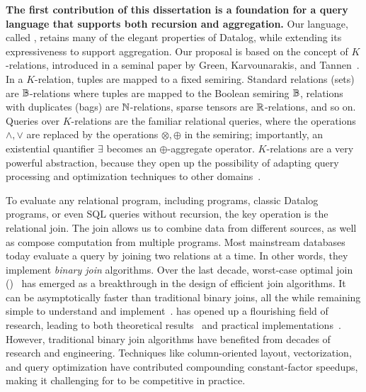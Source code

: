 \textbf{
The first contribution of this dissertation is a foundation for a query language that
supports both recursion and aggregation.}  
Our language, called \datalogo, 
 retains many of the elegant properties of Datalog,
 while extending its expressiveness to support aggregation.
Our proposal is based on the
concept of $K$-relations, introduced in a seminal
paper by Green, Karvounarakis, and Tannen~\cite{DBLP:conf/pods/GreenKT07}.
In a $K$-relation, tuples are
mapped to a fixed semiring. Standard relations (sets) are
$\mathbb B$-relations where tuples are mapped to the Boolean semiring $\mathbb B$,
relations with duplicates (bags) are $\mathbb N$-relations, sparse tensors
are $\mathbb R$-relations, and so on.  Queries over $K$-relations are the
familiar relational queries, where the operations $\wedge, \vee$ are
replaced by the operations $\otimes, \oplus$ in the semiring;
importantly, an existential quantifier $\exists$ becomes an
$\oplus$-aggregate operator.
$K$-relations are a very powerful abstraction, because they open up
the possibility of adapting query processing and optimization
techniques to other domains~\cite{DBLP:conf/pods/KhamisNR16}.

To evaluate any relational program, 
 including \datalogo programs,
 classic Datalog programs, 
 or even SQL queries without recursion, 
 the key operation is the relational join.
The join allows us to combine data from different sources, 
 as well as compose computation from multiple programs.
Most mainstream databases today evaluate a query 
 by joining two relations at a time.
In other words, they implement {\em binary join} algorithms.
Over the last decade, worst-case optimal join (\WCOJ)~\cite{
  DBLP:conf/pods/NgoPRR12,
  DBLP:conf/icdt/Veldhuizen14, 
  DBLP:journals/sigmod/NgoRR13, 
  DBLP:conf/pods/000118}
 has emerged as
 a breakthrough in the design of efficient join algorithms.  
It can be
asymptotically faster than traditional binary joins, all the while
remaining simple to understand and
implement~\cite{DBLP:journals/sigmod/NgoRR13}.  
\WCOJ has opened up a flourishing field of research, leading to both theoretical
results~\cite{DBLP:journals/sigmod/NgoRR13,DBLP:conf/pods/Khamis0S17}
and practical
implementations~\cite{DBLP:conf/icdt/Veldhuizen14,DBLP:journals/tods/AbergerLTNOR17,DBLP:journals/pvldb/FreitagBSKN20, DBLP:journals/pvldb/MhedhbiS19}.
However, traditional binary join algorithms have benefited from 
  decades of research and engineering.
Techniques like column-oriented layout, vectorization, 
  and query optimization
  have contributed compounding constant-factor speedups,
  making it challenging for \WCOJ to be competitive in practice.

